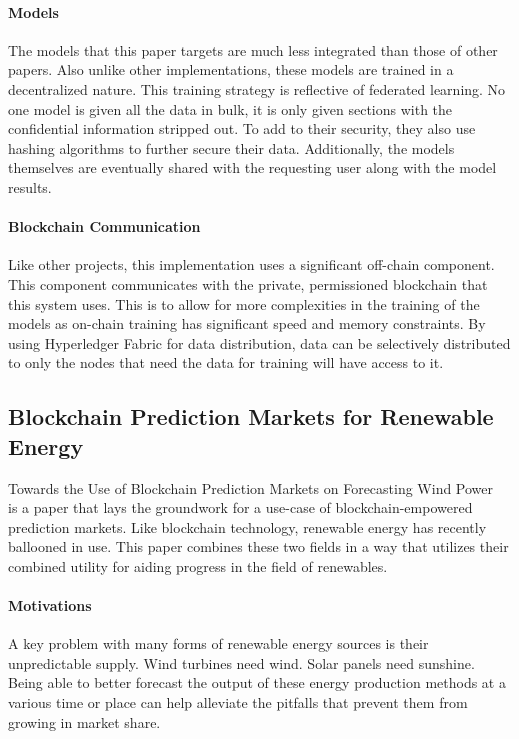 \documentclass{ledger}
\begin{document}
\paragraph{Models}
The models that this paper targets are much less integrated than those of other papers.  Also unlike other implementations,
these models are trained in a decentralized nature.  This training strategy is reflective of federated learning.  No
one model is given all the data in bulk, it is only given sections with the confidential information stripped out.
To add to their security, they also use hashing algorithms to further secure their data.  Additionally, the models
themselves are eventually shared with the requesting user along with the model results.

\paragraph{Blockchain Communication}
Like other projects, this implementation uses a significant off-chain component.  This component communicates
with the private, permissioned blockchain that this system uses.  This is to allow for more complexities
in the training of the models as on-chain training has significant speed and memory constraints.  By using Hyperledger
Fabric for data distribution, data can be selectively distributed to only the nodes that need the data for training will
have access to it.

\subsection{Blockchain Prediction Markets for Renewable Energy}

Towards the Use of Blockchain Prediction Markets on Forecasting Wind Power~\cite{windForcasting} is a paper that lays the
groundwork for a use-case of blockchain-empowered prediction markets. Like blockchain technology, renewable energy has
recently ballooned in use.  This paper combines these two fields in a way that utilizes their combined utility for
aiding progress in the field of renewables.

\paragraph{Motivations}
A key problem with many forms of renewable energy sources is their unpredictable supply. Wind turbines need wind. Solar
panels need sunshine. Being able to better forecast the output of these energy production methods at a various time or
place can help alleviate the pitfalls that prevent them from growing in market share.
\end{document}
